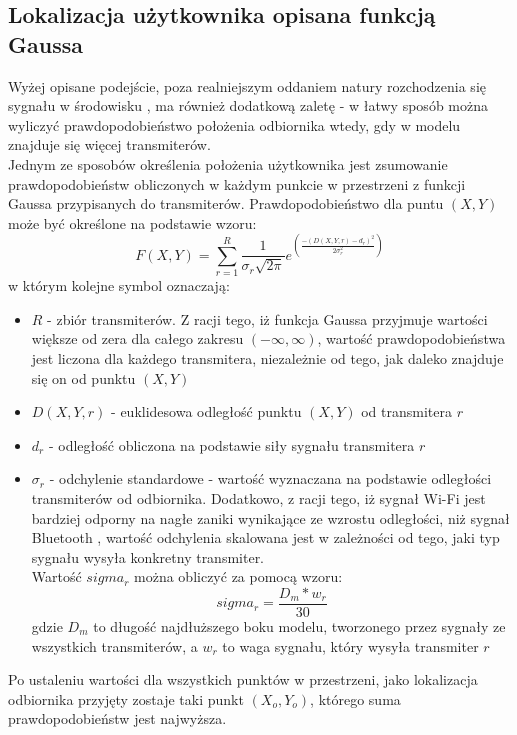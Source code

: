 \subsection{Lokalizacja użytkownika opisana funkcją Gaussa}
Wyżej opisane podejście, poza realniejszym oddaniem natury rozchodzenia się sygnału w środowisku \cite{TDECHN}, ma również dodatkową zaletę - w łatwy sposób można wyliczyć prawdopodobieństwo położenia odbiornika wtedy, gdy w modelu znajduje się więcej transmiterów.\\
Jednym ze sposobów określenia położenia użytkownika jest zsumowanie prawdopodobieństw obliczonych w każdym punkcie w przestrzeni z funkcji Gaussa przypisanych do transmiterów. Prawdopodobieństwo dla puntu $(X,Y)$ może być określone na podstawie wzoru:
\begin{equation}
F(X,Y) = \sum_{r=1}^{R} \frac{1}{\sigma_r\sqrt{2\pi}}e^{\left(\frac{-(D(X,Y,r)-d_r)^2}{2\sigma_r^2}\right)}
\end{equation}
w którym kolejne symbol oznaczają:
\begin{itemize}
	\item $R$ - zbiór transmiterów. Z racji tego, iż funkcja Gaussa przyjmuje wartości większe od zera dla całego zakresu $(-\infty,\infty)$, wartość prawdopodobieństwa jest liczona dla każdego transmitera, niezależnie od tego, jak daleko znajduje się on od punktu $(X,Y)$
	\item $D(X,Y,r)$ - euklidesowa odległość punktu $(X,Y)$ od transmitera $r$
	\item $d_r$ - odległość obliczona na podstawie siły sygnału transmitera $r$
	\item $\sigma_r$ - odchylenie standardowe - wartość wyznaczana na podstawie odległości transmiterów od odbiornika. Dodatkowo, z racji tego, iż sygnał Wi-Fi jest bardziej odporny na nagłe zaniki wynikające ze wzrostu odległości, niż sygnał Bluetooth \cite{BLUE}, wartość odchylenia skalowana jest w zależności od tego, jaki typ sygnału wysyła konkretny transmiter.\\
	Wartość $sigma_r$ można obliczyć za pomocą wzoru:
	\begin{equation}
		sigma_r = \frac{D_m * w_r}{30}
	\end{equation}
	gdzie $D_m$ to długość najdłuższego boku modelu, tworzonego przez sygnały ze wszystkich transmiterów, a $w_r$ to waga sygnału, który wysyła transmiter $r$
\end{itemize}
Po ustaleniu wartości dla wszystkich punktów w przestrzeni, jako lokalizacja odbiornika przyjęty zostaje taki punkt $(X_o,Y_o)$, którego suma prawdopodobieństw jest najwyższa.
